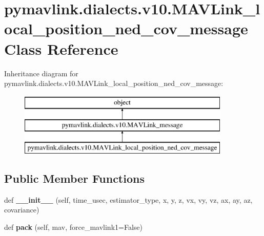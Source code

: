 \hypertarget{classpymavlink_1_1dialects_1_1v10_1_1MAVLink__local__position__ned__cov__message}{}\section{pymavlink.\+dialects.\+v10.\+M\+A\+V\+Link\+\_\+local\+\_\+position\+\_\+ned\+\_\+cov\+\_\+message Class Reference}
\label{classpymavlink_1_1dialects_1_1v10_1_1MAVLink__local__position__ned__cov__message}
Inheritance diagram for pymavlink.\+dialects.\+v10.\+M\+A\+V\+Link\+\_\+local\+\_\+position\+\_\+ned\+\_\+cov\+\_\+message\+:\begin{figure}[H]
\begin{center}
\leavevmode
\includegraphics[height=3.000000cm]{classpymavlink_1_1dialects_1_1v10_1_1MAVLink__local__position__ned__cov__message}
\end{center}
\end{figure}
\subsection*{Public Member Functions}
\begin{DoxyCompactItemize}
\item 
\mbox{\label{classpymavlink_1_1dialects_1_1v10_1_1MAVLink__local__position__ned__cov__message_adddeec287ff13a010d9457241e5a6e95}} 
def {\bfseries \+\_\+\+\_\+init\+\_\+\+\_\+} (self, time\+\_\+usec, estimator\+\_\+type, x, y, z, vx, vy, vz, ax, ay, az, covariance)
\item 
\mbox{\label{classpymavlink_1_1dialects_1_1v10_1_1MAVLink__local__position__ned__cov__message_a6df4de990bb2f69d1da15e4071fb5eb4}} 
def {\bfseries pack} (self, mav, force\+\_\+mavlink1=False)
\end{DoxyCompactItemize}
